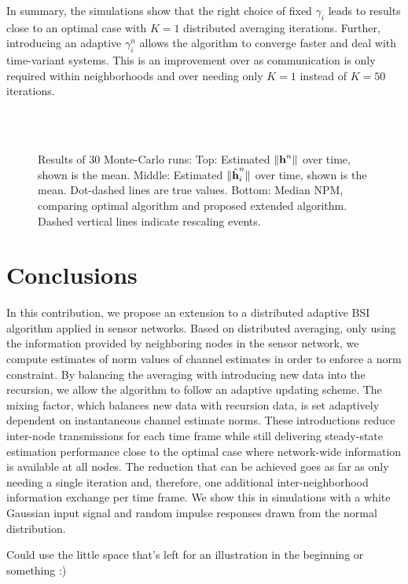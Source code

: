 \documentclass{article}
\begin{document}
In summary, the simulations show that the right choice of fixed \(\gamma_i\) leads to results close to an optimal case with \(K=1\) distributed averaging iterations.
Further, introducing an adaptive \(\gamma_i^n\) allows the algorithm to converge faster and deal with time-variant systems.
This is an improvement over \cite{blochbergerDBSI} as communication is only required within neighborhoods and over \cite{liuDistributedBlindIdentification2016,liuDistributedRecursiveBlind2017} needing only \(K=1\) instead of \(K=50\) iterations.


\begin{figure}[t]
    \centering
    \\\vspace*{-1.0cm}
    \\\vspace*{-1.0cm}
    
    \vspace*{-0.6cm}
    \caption[]{Results of 30 Monte-Carlo runs: Top: Estimated \(\|\bm{\mathrm{h}}^n\|\) over time, shown is the mean. Middle: Estimated \(\|\hat{\bm{\mathrm{h}}}_i^n\|\) over time, shown is the mean. Dot-dashed lines are true values. Bottom: Median NPM, comparing optimal algorithm and proposed extended algorithm. Dashed vertical lines indicate rescaling events.}
    \label{fig:simulations:NPMtimedyn}
\end{figure}

\section[]{Conclusions}
\label{sec:conclusions}
In this contribution, we propose an extension to a distributed adaptive BSI algorithm applied in sensor networks.
Based on distributed averaging, only using the information provided by neighboring nodes in the sensor network, we compute estimates of norm values of channel estimates in order to enforce a norm constraint.
By balancing the averaging with introducing new data into the recursion, we allow the algorithm to follow an adaptive updating scheme.
The mixing factor, which balances new data with recursion data, is set adaptively dependent on instantaneous channel estimate norms.
These introductions reduce inter-node transmissions for each time frame while still delivering steady-state estimation performance close to the optimal case where network-wide information is available at all nodes.
The reduction that can be achieved goes as far as only needing a single iteration and, therefore, one additional inter-neighborhood information exchange per time frame.
We show this in simulations with a white Gaussian input signal and random impulse responses drawn from the normal distribution.
\begin{todo}
    Could use the little space that's left for an illustration in the beginning or something :)
\end{todo}
\end{document}
